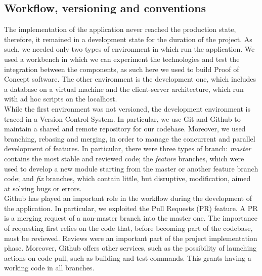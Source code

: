 \subsection{Workflow, versioning and conventions}
The implementation of the application never reached the production state, therefore, it remained in a development state for the duration of the project. As such, we needed only two types of environment in which run the application. We used a workbench in which we can experiment the technologies and test the integration between the components, as such here we used to build Proof of Concept software. The other environment is the development one, which includes a database on a virtual machine and the client-server architecture, which run with ad hoc scripts on the localhost.
\\ While the first environment was not versioned, the development environment is traced in a Version Control System. In particular, we use Git and Github to maintain a shared and remote repository for our codebase. Moreover, we used branching, rebasing and merging, in order to manage the concurrent and parallel development of features. In particular, there were three types of branch: \textit{master} contains the most stable and reviewed code; the \textit{feature} branches, which were used to develop a new module starting from the master or another feature branch code; and \textit{fix} branches, which contain little, but disruptive, modification, aimed at solving bugs or errors.
\\ Github has played an important role in the workflow during the development of the application. In particular, we exploited the Pull Requests (PR) feature. A PR is a merging request of a non-master branch into the master one. The importance of requesting first relies on the code that, before becoming part of the codebase, must be reviewed. Reviews were an important part of the project implementation phase. Moreover, Github offers other services, such as the possibility of launching actions on code pull, such as building and test commands. This grants having a working code in all branches. 

